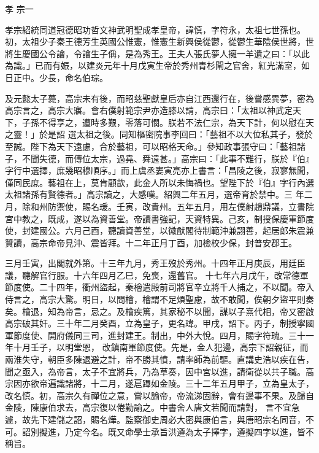 
\begin{pinyinscope}

 孝
 宗一



 孝宗紹統同道冠德昭功哲文神武明聖成孝皇帝，諱慎，字符永，太祖七世孫也。初，太祖少子秦王德芳生英國公惟憲，惟憲生新興侯從鬱，從鬱生華陰侯世將，世
 將生慶國公令譮，令譮生子偁，是為秀王。王夫人張氏夢人擁一羊遺之曰：「以此為識。」已而有娠，以建炎元年十月戊寅生帝於秀州青杉閘之官舍，紅光滿室，如日正中。少長，命名伯琮。



 及元懿太子薨，高宗未有後，而昭慈聖獻皇后亦自江西還行在，後嘗感異夢，密為高宗言之，高宗大寤。會右僕射範宗尹亦造膝以請，高宗曰：「太祖以神武定天下，子孫不得享之，遭時多艱，零落可憫。朕若不法仁宗，為天下計，何以慰在天之靈！」於是詔
 選太祖之後。同知樞密院事李回曰：「藝祖不以大位私其子，發於至誠。陛下為天下遠慮，合於藝祖，可以昭格天命。」參知政事張守曰：「藝祖諸子，不聞失德，而傳位太宗，過堯、舜遠甚。」高宗曰：「此事不難行，朕於『伯』字行中選擇，庶幾昭穆順序。」而上虞丞婁寅亮亦上書言：「昌陵之後，寂寥無聞，僅同民庶。藝祖在上，莫肯顧歆，此金人所以未悔禍也。望陛下於『伯』字行內選太祖諸孫有賢德者。」高宗讀之，大感嘆。紹興二年五月，選帝育於禁中。三
 年二月，除和州防禦使，賜名瑗。壬寅，改貴州。五年五月，用左僕射趙鼎議，立書院宮中教之，既成，遂以為資善堂。帝讀書強記，天資特異。己亥，制授保慶軍節度使，封建國公。六月己酉，聽讀資善堂，以徽猷閣待制範沖兼詡善，起居郎朱震兼贊讀，高宗命帝見沖、震皆拜。十二年正月丁酉，加檢校少保，封普安郡王。



 三月壬寅，出閣就外第。十三年九月，秀王歿於秀州。十四年正月庚辰，用廷臣議，聽解官行服。十六年四月乙巳，免喪，還舊官。
 十七年六月戊午，改常德軍節度使。二十四年，衢州盜起，秦檜遣殿前司將官辛立將千人捕之，不以聞。帝入侍言之，高宗大驚。明日，以問檜，檜謂不足煩聖慮，故不敢聞，俟朝夕盜平則奏矣。檜退，知為帝言，忌之。及檜疾篤，其家秘不以聞，謀以子熹代相，帝又密啟高宗破其奸。三十年二月癸酉，立為皇子，更名瑋。甲戌，詔下。丙子，制授寧國軍節度使、開府儀同三司，進封建王。制出，中外大悅。四月，賜字符瑰。三十一年十月壬子，以明堂恩，
 改鎮南軍節度使。先是，金人犯邊，高宗下詔親征，而兩淮失守，朝臣多陳退避之計，帝不勝其憤，請率師為前驅。直講史浩以疾在告，聞之亟入，為帝言，太子不宜將兵，乃為草奏，因中宮以進，請衛從以共子職。高宗因亦欲帝遍識諸將，十二月，遂扈蹕如金陵。三十二年五月甲子，立為皇太子，改名慎。初，高宗久有禪位之意，嘗以諭帝，帝流涕固辭，會有邊事不果。及歸自金陵，陳康伯求去，高宗復以倦勤諭之。中書舍人唐文若聞而請對，
 言不宜急遽，故先下建儲之詔，賜名燁。監察御史周必大密與康伯言，與唐昭宗名同音，不可。詔別擬進，乃定今名。既又命學士承旨洪遵為太子擇字，遵擬四字以進，皆不稱旨。




\end{pinyinscope}
